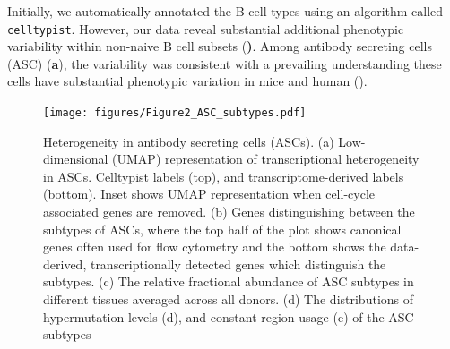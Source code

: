 Initially, we automatically annotated the B cell types using an algorithm called \verb|celltypist|\cite{dominguez2022cross}. However, our data reveal substantial additional phenotypic variability within non-naive B cell subsets (\textbf). Among antibody secreting cells (ASC) (\textbf{a}), the variability was consistent with a prevailing understanding these cells have substantial phenotypic variation in mice and human (\cite{tarlinton2023making, halliley2015long}). 

\begin{figure}
    \centering
    \texttt{[image: figures/Figure2\_ASC\_subtypes.pdf]}

    \caption{Heterogeneity in antibody secreting cells (ASCs). (a) Low-dimensional (UMAP) representation of transcriptional heterogeneity in ASCs. Celltypist labels (top), and transcriptome-derived labels (bottom). Inset shows UMAP representation when cell-cycle associated genes are removed. (b) Genes distinguishing between the subtypes of ASCs, where the top half of the plot shows canonical genes often used for flow cytometry and the bottom shows the data-derived, transcriptionally detected genes which distinguish the subtypes. (c) The relative fractional abundance of ASC subtypes in different tissues averaged across all donors. (d) The distributions of  hypermutation levels (d),  and constant region usage (e) of the ASC subtypes}
    \label{fig:asc-overview}
\end{figure}
